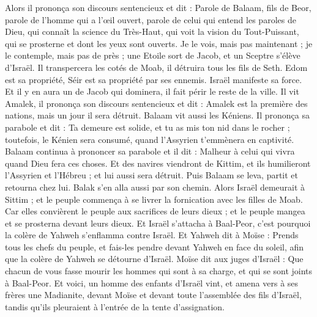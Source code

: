 \begin{multicols}{2}
Alors il prononça son discours sentencieux et dit : Parole de Balaam, fils de Beor, parole de l'homme qui a l'œil ouvert,
parole de celui qui entend les paroles de Dieu, qui connaît la science du Très-Haut, qui voit la vision du Tout-Puissant, qui se prosterne et dont les yeux sont ouverts.
Je le vois, mais pas maintenant ; je le contemple, mais pas de près ; une Etoile sort de Jacob, et un Sceptre s'élève d'Israël. Il transpercera les cotés de Moab, il détruira tous les fils de Seth.
Edom est sa propriété, Séir est sa propriété par ses ennemis. Israël manifeste sa force.
Et il y en aura un de Jacob qui dominera, il fait périr le reste de la ville.
Il vit Amalek, il prononça son discours sentencieux et dit : Amalek est la première des nations, mais un jour il sera détruit.
Balaam vit aussi les Kéniens. Il prononça sa parabole et dit : Ta demeure est solide, et tu as mis ton nid dans le rocher ;
toutefois, le Kénien sera consumé, quand l'Assyrien t'emmènera en captivité.
Balaam continua à prononcer sa parabole et il dit : Malheur à celui qui vivra quand Dieu fera ces choses.
Et des navires viendront de Kittim, et ils humilieront l'Assyrien et l'Hébreu ; et lui aussi sera détruit.
Puis Balaam se leva, partit et retourna chez lui. Balak s'en alla aussi par son chemin.
\VerseOne{}Alors Israël demeurait à Sittim ; et le peuple commença à se livrer la fornication avec les filles de Moab.
Car elles convièrent le peuple aux sacrifices de leurs dieux ; et le peuple mangea et se prosterna devant leurs dieux.
Et Israël s'attacha à Baal-Peor, c'est pourquoi la colère de Yahweh s'enflamma contre Israël.
Et Yahweh dit à Moïse : Prends tous les chefs du peuple, et fais-les pendre  devant Yahweh en face du soleil, afin que la colère de Yahweh se détourne d'Israël.
Moïse dit aux juges d'Israël : Que chacun de vous fasse mourir les hommes qui sont à sa charge, et qui se sont joints à Baal-Peor.
Et voici, un homme des enfants d'Israël vint, et amena vers à ses frères une Madianite, devant Moïse et devant toute l'assemblée des fils d'Israël, tandis qu'ils pleuraient à l'entrée de la tente d'assignation.

\end{multicols}
